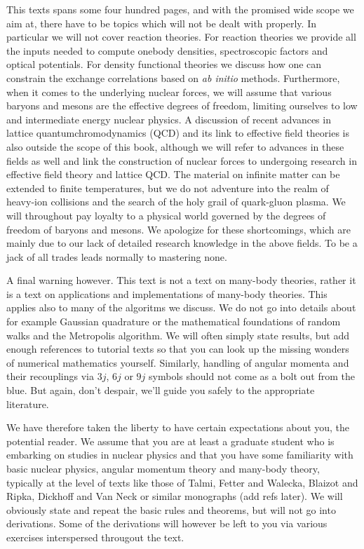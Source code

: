 \documentclass[graybox,sectrefs,envcountresetchap,open=right]{svmonodo}
\begin{document}
This texts spans some four hundred pages, and with the promised wide scope we aim at, 
there have to be topics which will not be dealt with properly.
In particular we will not cover  reaction theories.  
For reaction theories we provide all the inputs needed to compute
onebody densities, spectroscopic factors and optical potentials. 
For density functional theories we discuss how one can constrain the exchange correlations based on \emph{ab initio} methods.
Furthermore, when it comes to the underlying nuclear forces, we will assume that various baryons and mesons are the 
effective degrees of freedom, limiting ourselves to low and intermediate energy nuclear physics.  A discussion of recent 
advances in lattice quantumchromodynamics (QCD) and its link to effective field theories is also outside the scope
of this book, although we will refer to advances in these fields as well and link the construction of nuclear forces to
undergoing research in effective field theory and lattice QCD.  
The material on infinite matter can be extended to finite temperatures, but we do not 
adventure into the realm of heavy-ion collisions and the search of the holy grail of quark-gluon plasma. 
We will throughout pay loyalty to a physical world governed by the degrees of freedom of baryons and mesons.
We apologize for these shortcomings, which are mainly due to
our lack of detailed research knowledge in the above fields. To be a jack of all trades leads normally to mastering none.

A final warning however.
This text is not a text on many-body theories, rather it is
a text on applications and implementations of many-body theories. This applies also to many of the algoritms  we discuss.  We do not go into
details about for example Gaussian quadrature or the mathematical foundations of random walks and the Metropolis algorithm.  We will often simply state results, but add 
enough references to tutorial texts so that you can look up the missing wonders of numerical mathematics yourself.
Similarly,  handling of angular momenta and their recouplings via $3j$, $6j$ or $9j$ symbols should  not  come as a bolt out from the blue. But again, don't despair,
we'll guide you safely to the appropriate literature.

We have therefore taken the liberty to have  certain expectations about you, the potential reader.  
We assume that you are at least a graduate student who is embarking on studies in 
nuclear physics and that
you have some familiarity with basic nuclear physics, angular momentum theory and many-body theory, 
typically at the level of texts like those of Talmi, Fetter and Walecka, Blaizot and Ripka, Dickhoff and Van Neck or similar monographs (add refs later). 
We will obviously state and repeat the basic rules and theorems, but will not go into derivations.  
Some of the derivations will however be left to you via various exercises interspersed througout the text.
\end{document}
